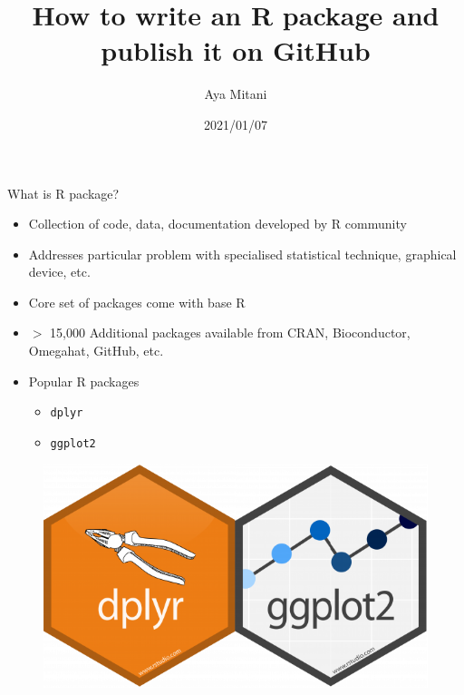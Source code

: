 \documentclass[
  ignorenonframetext,
]{beamer}
\title{How to write an R package and publish it on GitHub}
\author{Aya Mitani}
\date{2021/01/07}
\providecommand{\tightlist}{%
  \setlength{\itemsep}{0pt}\setlength{\parskip}{0pt}}
\begin{document}
\frame{\titlepage}

\begin{frame}[fragile]{What is R package?}
\protect\hypertarget{what-is-r-package}{}

\begin{itemize}
\tightlist
\item
  Collection of code, data, documentation developed by R community
\item
  Addresses particular problem with specialised statistical technique,
  graphical device, etc.
\item
  Core set of packages come with base R
\item
  \(>\) 15,000 Additional packages available from CRAN, Bioconductor,
  Omegahat, GitHub, etc.
\item
  Popular R packages

  \begin{itemize}
  \tightlist
  \item
    \texttt{dplyr}
  \item
    \texttt{ggplot2}
  \end{itemize}
\end{itemize}

\begin{figure}
  \includegraphics[scale=0.2]{slides_files/figure-beamer/dplyrggplot2.png}
\end{figure}

\end{frame}
\end{document}

